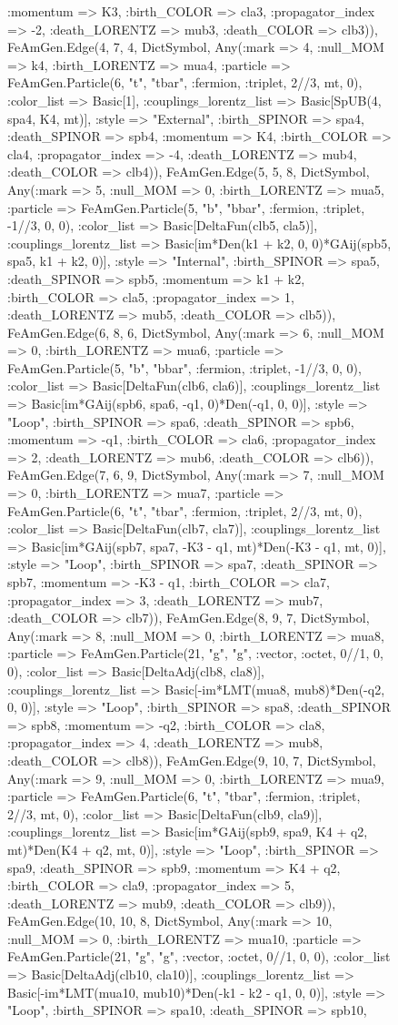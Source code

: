 \documentclass{revtex4}
\begin{document}
\begin{figure}[!htb]
\begin{center}
{:momentum => K3, :birth_COLOR => cla3, :propagator_index => -2, :death_LORENTZ => mub3, :death_COLOR => clb3)), FeAmGen.Edge(4, 7, 4, Dict{Symbol, Any}(:mark => 4, :null_MOM => k4, :birth_LORENTZ => mua4, :particle => FeAmGen.Particle(6, "t", "tbar", :fermion, :triplet, 2//3, mt, 0), :color_list => Basic[1], :couplings_lorentz_list => Basic[SpUB(4, spa4, K4, mt)], :style => "External", :birth_SPINOR => spa4, :death_SPINOR => spb4, :momentum => K4, :birth_COLOR => cla4, :propagator_index => -4, :death_LORENTZ => mub4, :death_COLOR => clb4)), FeAmGen.Edge(5, 5, 8, Dict{Symbol, Any}(:mark => 5, :null_MOM => 0, :birth_LORENTZ => mua5, :particle => FeAmGen.Particle(5, "b", "bbar", :fermion, :triplet, -1//3, 0, 0), :color_list => Basic[DeltaFun(clb5, cla5)], :couplings_lorentz_list => Basic[im*Den(k1 + k2, 0, 0)*GAij(spb5, spa5, k1 + k2, 0)], :style => "Internal", :birth_SPINOR => spa5, :death_SPINOR => spb5, :momentum => k1 + k2, :birth_COLOR => cla5, :propagator_index => 1, :death_LORENTZ => mub5, :death_COLOR => clb5)), FeAmGen.Edge(6, 8, 6, Dict{Symbol, Any}(:mark => 6, :null_MOM => 0, :birth_LORENTZ => mua6, :particle => FeAmGen.Particle(5, "b", "bbar", :fermion, :triplet, -1//3, 0, 0), :color_list => Basic[DeltaFun(clb6, cla6)], :couplings_lorentz_list => Basic[im*GAij(spb6, spa6, -q1, 0)*Den(-q1, 0, 0)], :style => "Loop", :birth_SPINOR => spa6, :death_SPINOR => spb6, :momentum => -q1, :birth_COLOR => cla6, :propagator_index => 2, :death_LORENTZ => mub6, :death_COLOR => clb6)), FeAmGen.Edge(7, 6, 9, Dict{Symbol, Any}(:mark => 7, :null_MOM => 0, :birth_LORENTZ => mua7, :particle => FeAmGen.Particle(6, "t", "tbar", :fermion, :triplet, 2//3, mt, 0), :color_list => Basic[DeltaFun(clb7, cla7)], :couplings_lorentz_list => Basic[im*GAij(spb7, spa7, -K3 - q1, mt)*Den(-K3 - q1, mt, 0)], :style => "Loop", :birth_SPINOR => spa7, :death_SPINOR => spb7, :momentum => -K3 - q1, :birth_COLOR => cla7, :propagator_index => 3, :death_LORENTZ => mub7, :death_COLOR => clb7)), FeAmGen.Edge(8, 9, 7, Dict{Symbol, Any}(:mark => 8, :null_MOM => 0, :birth_LORENTZ => mua8, :particle => FeAmGen.Particle(21, "g", "g", :vector, :octet, 0//1, 0, 0), :color_list => Basic[DeltaAdj(clb8, cla8)], :couplings_lorentz_list => Basic[-im*LMT(mua8, mub8)*Den(-q2, 0, 0)], :style => "Loop", :birth_SPINOR => spa8, :death_SPINOR => spb8, :momentum => -q2, :birth_COLOR => cla8, :propagator_index => 4, :death_LORENTZ => mub8, :death_COLOR => clb8)), FeAmGen.Edge(9, 10, 7, Dict{Symbol, Any}(:mark => 9, :null_MOM => 0, :birth_LORENTZ => mua9, :particle => FeAmGen.Particle(6, "t", "tbar", :fermion, :triplet, 2//3, mt, 0), :color_list => Basic[DeltaFun(clb9, cla9)], :couplings_lorentz_list => Basic[im*GAij(spb9, spa9, K4 + q2, mt)*Den(K4 + q2, mt, 0)], :style => "Loop", :birth_SPINOR => spa9, :death_SPINOR => spb9, :momentum => K4 + q2, :birth_COLOR => cla9, :propagator_index => 5, :death_LORENTZ => mub9, :death_COLOR => clb9)), FeAmGen.Edge(10, 10, 8, Dict{Symbol, Any}(:mark => 10, :null_MOM => 0, :birth_LORENTZ => mua10, :particle => FeAmGen.Particle(21, "g", "g", :vector, :octet, 0//1, 0, 0), :color_list => Basic[DeltaAdj(clb10, cla10)], :couplings_lorentz_list => Basic[-im*LMT(mua10, mub10)*Den(-k1 - k2 - q1, 0, 0)], :style => "Loop", :birth_SPINOR => spa10, :death_SPINOR => spb10, }
\end{center}
\end{figure}
\end{document}
